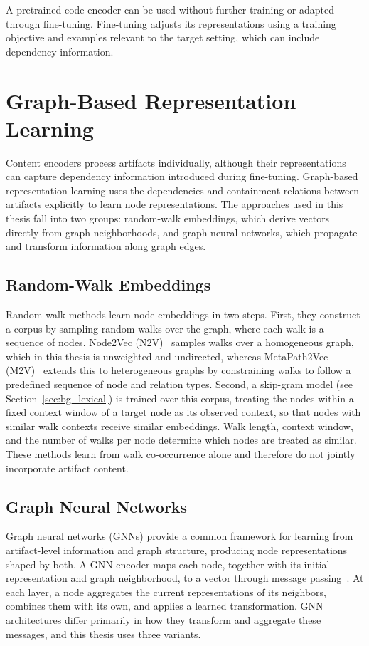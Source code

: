 A pretrained code encoder can be used without further training or adapted through fine-tuning. Fine-tuning adjusts its representations using a training objective and examples relevant to the target setting, which can include dependency information.

\section[Graph Representation Learning]{Graph-Based Representation Learning \label{sec:bg-gnn}}

Content encoders process artifacts individually, although their representations can capture dependency information introduced during fine-tuning. Graph-based representation learning uses the dependencies and containment relations between artifacts explicitly to learn node representations. The approaches used in this thesis fall into two groups: random-walk embeddings, which derive vectors directly from graph neighborhoods, and graph neural networks, which propagate and transform information along graph edges.

\subsection{Random-Walk Embeddings \label{sec:bg_random_walk}}
Random-walk methods learn node embeddings in two steps. First, they construct a corpus by sampling random walks over the graph, where each walk is a sequence of nodes. Node2Vec (N2V)~\cite{node2vec} samples walks over a homogeneous graph, which in this thesis is unweighted and undirected, whereas MetaPath2Vec (M2V)~\cite{metapath2vec} extends this to heterogeneous graphs by constraining walks to follow a predefined sequence of node and relation types. Second, a skip-gram model (see Section~\ref{sec:bg_lexical}) is trained over this corpus, treating the nodes within a fixed context window of a target node as its observed context, so that nodes with similar walk contexts receive similar embeddings. Walk length, context window, and the number of walks per node determine which nodes are treated as similar. These methods learn from walk co-occurrence alone and therefore do not jointly incorporate artifact content.

\subsection{Graph Neural Networks \label{sec:bg_gnns}}
Graph neural networks (GNNs) provide a common framework for learning from artifact-level information and graph structure, producing node representations shaped by both. A GNN encoder maps each node, together with its initial representation and graph neighborhood, to a vector through message passing~\cite{neuralMP}. At each layer, a node aggregates the current representations of its neighbors, combines them with its own, and applies a learned transformation. GNN architectures differ primarily in how they transform and aggregate these messages, and this thesis uses three variants.


